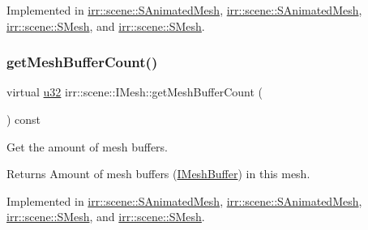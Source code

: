 Implemented in \hyperlink{structirr_1_1scene_1_1SAnimatedMesh_a3c010c881f315e56a05f40632f3c7f79}{irr\+::scene\+::\+S\+Animated\+Mesh}, \hyperlink{structirr_1_1scene_1_1SAnimatedMesh_a3c010c881f315e56a05f40632f3c7f79}{irr\+::scene\+::\+S\+Animated\+Mesh}, \hyperlink{structirr_1_1scene_1_1SMesh_a768eeba9148e949d6962bee08517a056}{irr\+::scene\+::\+S\+Mesh}, and \hyperlink{structirr_1_1scene_1_1SMesh_a768eeba9148e949d6962bee08517a056}{irr\+::scene\+::\+S\+Mesh}.

\mbox{\label{classirr_1_1scene_1_1IMesh_a2ebed0bdae2d6537c36b0b7ac831edb8}} 
\subsubsection{\texorpdfstring{get\+Mesh\+Buffer\+Count()}{getMeshBufferCount()}\hspace{0.1cm}{\footnotesize\ttfamily [1/2]}}
{\footnotesize\ttfamily virtual \hyperlink{namespaceirr_a0416a53257075833e7002efd0a18e804}{u32} irr\+::scene\+::\+I\+Mesh\+::get\+Mesh\+Buffer\+Count (\begin{DoxyParamCaption}{ }\end{DoxyParamCaption}) const\hspace{0.3cm}{\ttfamily [pure virtual]}}



Get the amount of mesh buffers. 

\begin{DoxyReturn}{Returns}
Amount of mesh buffers (\hyperlink{classirr_1_1scene_1_1IMeshBuffer}{I\+Mesh\+Buffer}) in this mesh. 
\end{DoxyReturn}


Implemented in \hyperlink{structirr_1_1scene_1_1SAnimatedMesh_a01dd8fd3ea4a53af90599697cd34ea01}{irr\+::scene\+::\+S\+Animated\+Mesh}, \hyperlink{structirr_1_1scene_1_1SAnimatedMesh_a01dd8fd3ea4a53af90599697cd34ea01}{irr\+::scene\+::\+S\+Animated\+Mesh}, \hyperlink{structirr_1_1scene_1_1SMesh_a08f677a62f8e3770af70293c8043fff4}{irr\+::scene\+::\+S\+Mesh}, and \hyperlink{structirr_1_1scene_1_1SMesh_a08f677a62f8e3770af70293c8043fff4}{irr\+::scene\+::\+S\+Mesh}.

\mbox{\label{classirr_1_1scene_1_1IMesh_a2ebed0bdae2d6537c36b0b7ac831edb8}} 
